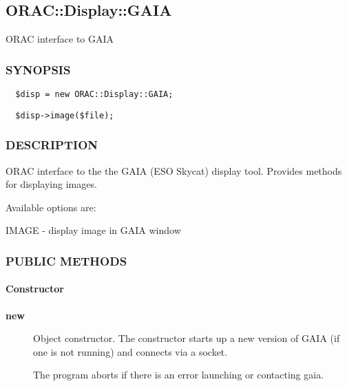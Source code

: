 \subsection{ORAC::Display::GAIA\label{ORAC::Display::GAIA}}


ORAC interface to GAIA

\subsubsection*{SYNOPSIS\label{ORAC::Display::GAIA_SYNOPSIS}}
\begin{verbatim}
  $disp = new ORAC::Display::GAIA;
\end{verbatim}
\begin{verbatim}
  $disp->image($file);
\end{verbatim}
\subsubsection*{DESCRIPTION\label{ORAC::Display::GAIA_DESCRIPTION}}


ORAC interface to the the GAIA (ESO Skycat) display tool. Provides methods
for displaying images.



Available options are:



IMAGE - display image in GAIA window

\subsubsection*{PUBLIC METHODS\label{ORAC::Display::GAIA_PUBLIC_METHODS}}
\paragraph*{Constructor\label{ORAC::Display::GAIA_Constructor}}
\begin{description}

\item[{\textbf{new}}] \mbox{}

Object constructor. The constructor starts up a new version of
GAIA (if one is not running) and connects via a socket.



The program aborts if there is an error launching or contacting
gaia.

\end{description}
